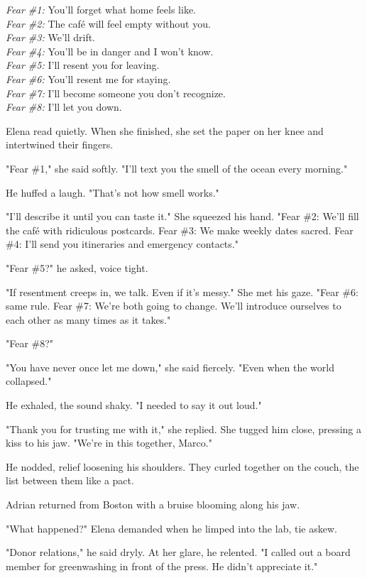 \textit{Fear \#1:} You'll forget what home feels like. \\
\textit{Fear \#2:} The café will feel empty without you. \\
\textit{Fear \#3:} We'll drift. \\
\textit{Fear \#4:} You'll be in danger and I won't know. \\
\textit{Fear \#5:} I'll resent you for leaving. \\
\textit{Fear \#6:} You'll resent me for staying. \\
\textit{Fear \#7:} I'll become someone you don't recognize. \\
\textit{Fear \#8:} I'll let you down.

Elena read quietly. When she finished, she set the paper on her knee and intertwined their fingers.

"Fear \#1," she said softly. "I'll text you the smell of the ocean every morning."

He huffed a laugh. "That's not how smell works."

"I'll describe it until you can taste it." She squeezed his hand. "Fear \#2: We'll fill the café with ridiculous postcards. Fear \#3: We make weekly dates sacred. Fear \#4: I'll send you itineraries and emergency contacts."

"Fear \#5?" he asked, voice tight.

"If resentment creeps in, we talk. Even if it's messy." She met his gaze. "Fear \#6: same rule. Fear \#7: We're both going to change. We'll introduce ourselves to each other as many times as it takes."

"Fear \#8?"

"You have never once let me down," she said fiercely. "Even when the world collapsed."

He exhaled, the sound shaky. "I needed to say it out loud."

"Thank you for trusting me with it," she replied. She tugged him close, pressing a kiss to his jaw. "We're in this together, Marco."

He nodded, relief loosening his shoulders. They curled together on the couch, the list between them like a pact.

\bigskip

Adrian returned from Boston with a bruise blooming along his jaw.

"What happened?" Elena demanded when he limped into the lab, tie askew.

"Donor relations," he said dryly. At her glare, he relented. "I called out a board member for greenwashing in front of the press. He didn't appreciate it."

